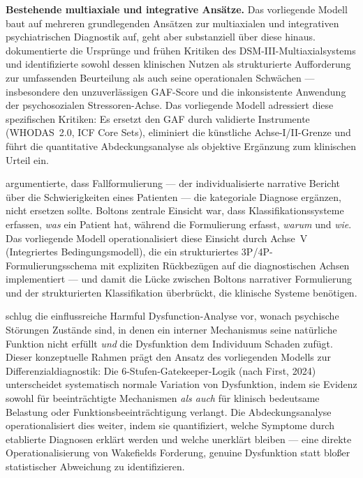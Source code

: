 \documentclass[11pt,a4paper]{article}
\begin{document}
\textbf{Bestehende multiaxiale und integrative Ans\"atze.} Das vorliegende Modell baut auf mehreren grundlegenden Ans\"atzen zur multiaxialen und integrativen psychiatrischen Diagnostik auf, geht aber substanziell \"uber diese hinaus. \citet{Williams1985MultiaxialOrigins} dokumentierte die Urspr\"unge und fr\"uhen Kritiken des DSM-III-Multiaxialsystems und identifizierte sowohl dessen klinischen Nutzen als strukturierte Aufforderung zur umfassenden Beurteilung als auch seine operationalen Schw\"achen --- insbesondere den unzuverl\"assigen GAF-Score und die inkonsistente Anwendung der psychosozialen Stressoren-Achse. Das vorliegende Modell adressiert diese spezifischen Kritiken: Es ersetzt den GAF durch validierte Instrumente (WHODAS~2.0, ICF Core Sets), eliminiert die k\"unstliche Achse-I/II-Grenze und f\"uhrt die quantitative Abdeckungsanalyse als objektive Erg\"anzung zum klinischen Urteil ein.

\citet{Bolton2008FormulationBook} argumentierte, dass Fallformulierung --- der individualisierte narrative Bericht \"uber die Schwierigkeiten eines Patienten --- die kategoriale Diagnose erg\"anzen, nicht ersetzen sollte. Boltons zentrale Einsicht war, dass Klassifikationssysteme erfassen, \textit{was} ein Patient hat, w\"ahrend die Formulierung erfasst, \textit{warum} und \textit{wie}. Das vorliegende Modell operationalisiert diese Einsicht durch Achse~V (Integriertes Bedingungsmodell), die ein strukturiertes 3P/4P-Formulierungsschema mit expliziten R\"uckbez\"ugen auf die diagnostischen Achsen implementiert --- und damit die L\"ucke zwischen Boltons narrativer Formulierung und der strukturierten Klassifikation \"uberbr\"uckt, die klinische Systeme ben\"otigen.

\citet{Wakefield1992HarmfulDysfunction} schlug die einflussreiche \glqq Harmful Dysfunction\grqq{}-Analyse vor, wonach psychische St\"orungen Zust\"ande sind, in denen ein interner Mechanismus seine nat\"urliche Funktion nicht erf\"ullt \textit{und} die Dysfunktion dem Individuum Schaden zuf\"ugt. Dieser konzeptuelle Rahmen pr\"agt den Ansatz des vorliegenden Modells zur Differenzialdiagnostik: Die 6-Stufen-Gatekeeper-Logik (nach First, 2024) unterscheidet systematisch normale Variation von Dysfunktion, indem sie Evidenz sowohl f\"ur beeintr\"achtigte Mechanismen \textit{als auch} f\"ur klinisch bedeutsame Belastung oder Funktionsbeeintr\"achtigung verlangt. Die Abdeckungsanalyse operationalisiert dies weiter, indem sie quantifiziert, welche Symptome durch etablierte Diagnosen erkl\"art werden und welche unerkl\"art bleiben --- eine direkte Operationalisierung von Wakefields Forderung, genuine Dysfunktion statt blo\ss{}er statistischer Abweichung zu identifizieren.
\end{document}
